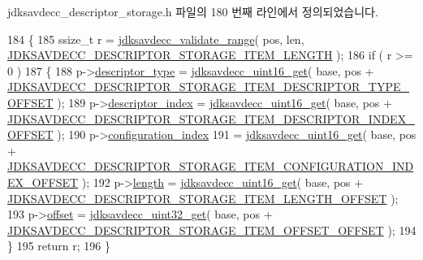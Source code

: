 jdksavdecc\+\_\+descriptor\+\_\+storage.\+h 파일의 180 번째 라인에서 정의되었습니다.


\begin{DoxyCode}
184 \{
185     ssize\_t r = \hyperlink{group__util_ga9c02bdfe76c69163647c3196db7a73a1}{jdksavdecc\_validate\_range}( pos, len, 
      \hyperlink{group__descriptor__storage__item_ga929fd9464abbbbf3d66fc15109d022b3}{JDKSAVDECC\_DESCRIPTOR\_STORAGE\_ITEM\_LENGTH} );
186     \textcolor{keywordflow}{if} ( r >= 0 )
187     \{
188         p->\hyperlink{structjdksavdecc__descriptor__storage__item_ab7c32b6c7131c13d4ea3b7ee2f09b78d}{descriptor\_type} = \hyperlink{group__endian_ga3fbbbc20be954aa61e039872965b0dc9}{jdksavdecc\_uint16\_get}( base, pos + 
      \hyperlink{group__descriptor__storage__item_gae98a7643c1209f2ed405f156d01df21a}{JDKSAVDECC\_DESCRIPTOR\_STORAGE\_ITEM\_DESCRIPTOR\_TYPE\_OFFSET}
       );
189         p->\hyperlink{structjdksavdecc__descriptor__storage__item_a042bbc76d835b82d27c1932431ee38d4}{descriptor\_index} = \hyperlink{group__endian_ga3fbbbc20be954aa61e039872965b0dc9}{jdksavdecc\_uint16\_get}( base, pos + 
      \hyperlink{group__descriptor__storage__item_ga91a9b298385f93e5d97973b84a3c1c50}{JDKSAVDECC\_DESCRIPTOR\_STORAGE\_ITEM\_DESCRIPTOR\_INDEX\_OFFSET}
       );
190         p->\hyperlink{structjdksavdecc__descriptor__storage__item_afaad1bd7c66f9611e134d8c5ce98f444}{configuration\_index}
191             = \hyperlink{group__endian_ga3fbbbc20be954aa61e039872965b0dc9}{jdksavdecc\_uint16\_get}( base, pos + 
      \hyperlink{group__descriptor__storage__item_ga7206999291660720b4a417c04b96c57b}{JDKSAVDECC\_DESCRIPTOR\_STORAGE\_ITEM\_CONFIGURATION\_INDEX\_OFFSET}
       );
192         p->\hyperlink{structjdksavdecc__descriptor__storage__item_a1892eba2086d12ac2b09005aeb09ea3b}{length} = \hyperlink{group__endian_ga3fbbbc20be954aa61e039872965b0dc9}{jdksavdecc\_uint16\_get}( base, pos + 
      \hyperlink{group__descriptor__storage__item_ga0af0a97779ffef38b1266e5443eef4e5}{JDKSAVDECC\_DESCRIPTOR\_STORAGE\_ITEM\_LENGTH\_OFFSET} );
193         p->\hyperlink{structjdksavdecc__descriptor__storage__item_a894bdfa2d603d8343f8ef01dda6fcd23}{offset} = \hyperlink{group__endian_gaefcf5bd4f368997a82f358ab89052d6b}{jdksavdecc\_uint32\_get}( base, pos + 
      \hyperlink{group__descriptor__storage__item_ga000aff4bba560ff201846087f2a3744c}{JDKSAVDECC\_DESCRIPTOR\_STORAGE\_ITEM\_OFFSET\_OFFSET} );
194     \}
195     \textcolor{keywordflow}{return} r;
196 \}
\end{DoxyCode}


